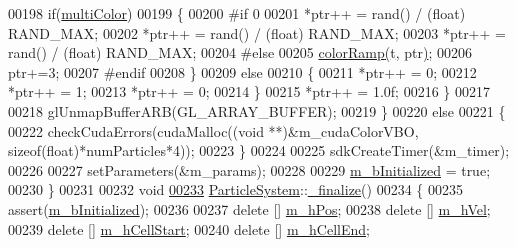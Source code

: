 \begin{DoxyCode}
00198                         \textcolor{keywordflow}{if}(\hyperlink{particle_system_8cpp_a54f61e4f37db321d451436bf2201b8cb}{multiColor})
00199                         \{
00200 #\textcolor{keywordflow}{if} 0
00201             *ptr++ = rand() / (\textcolor{keywordtype}{float}) RAND\_MAX;
00202             *ptr++ = rand() / (\textcolor{keywordtype}{float}) RAND\_MAX;
00203             *ptr++ = rand() / (\textcolor{keywordtype}{float}) RAND\_MAX;
00204 #\textcolor{keywordflow}{else}
00205             \hyperlink{particle_system_8cpp_a1ec1ae39a0b30ca8330f7839a624f302}{colorRamp}\hyperlink{particle_system_8cpp_a1ec1ae39a0b30ca8330f7839a624f302}{(}t\hyperlink{particle_system_8cpp_a1ec1ae39a0b30ca8330f7839a624f302}{,} ptr\hyperlink{particle_system_8cpp_a1ec1ae39a0b30ca8330f7839a624f302}{)};
00206             ptr+=3;
00207 #endif
00208                         \}
00209                         \textcolor{keywordflow}{else}
00210                         \{
00211                                 *ptr++ = 0;
00212                                 *ptr++ = 1;
00213                                 *ptr++ = 0;
00214                         \}
00215             *ptr++ = 1.0f;
00216         \}
00217 
00218         glUnmapBufferARB(GL\_ARRAY\_BUFFER);
00219     \}
00220     \textcolor{keywordflow}{else}
00221     \{
00222         checkCudaErrors(cudaMalloc((\textcolor{keywordtype}{void} **)&m\_cudaColorVBO, \textcolor{keyword}{sizeof}(\textcolor{keywordtype}{float})*numParticles*4));
00223     \}
00224 
00225     sdkCreateTimer(&m\_timer);
00226 
00227     setParameters(&m\_params);
00228 
00229     \hyperlink{class_particle_system_a21bbfba9d8701a70bc6fddbf4fc3f5bd}{m\_bInitialized} = \textcolor{keyword}{true};
00230 \}
00231 
00232 \textcolor{keywordtype}{void}
\hypertarget{particle_system_8cpp_source_l00233}{}\hyperlink{class_particle_system_a5d6a52db7d1277c8fe734ecceb69e5c6}{00233} \hyperlink{class_particle_system}{ParticleSystem}::\hyperlink{class_particle_system_a5d6a52db7d1277c8fe734ecceb69e5c6}{\_finalize}()
00234 \{
00235     assert(\hyperlink{class_particle_system_a21bbfba9d8701a70bc6fddbf4fc3f5bd}{m\_bInitialized});
00236 
00237     \textcolor{keyword}{delete} [] \hyperlink{class_particle_system_ab9d75471d2eaaeb8fa98d2f3f47d9c25}{m\_hPos};
00238     \textcolor{keyword}{delete} [] \hyperlink{class_particle_system_a20560c896ee8a8bbc827a8e5902da7e2}{m\_hVel};
00239     \textcolor{keyword}{delete} [] \hyperlink{class_particle_system_a8412ecd991c14d906fcebba42bdeffd3}{m\_hCellStart};
00240     \textcolor{keyword}{delete} [] \hyperlink{class_particle_system_a8d8ad2d142f3a5b83f2c10a46f5d7a8b}{m\_hCellEnd};

\end{DoxyCode}

